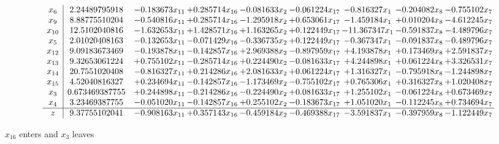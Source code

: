 \documentclass[10pt]{article}
\begin{document}
 \[\begin{array}{c| c c@{\hskip 2pt} c@{\hskip 2pt} c@{\hskip 2pt} c@{\hskip 2pt} c@{\hskip 2pt} c@{\hskip 2pt} c@{\hskip 2pt} }
 x_{6}   &  2.24489795918 & -0.183673 x_{11} & + 0.285714 x_{16} & -0.081633 x_{2} & -0.061224 x_{17} & -0.816327 x_{1} & -0.204082 x_{8} & -0.755102 x_{7}\\
 x_{9}   &  8.88775510204 & -0.540816 x_{11} & + 0.285714 x_{16} & -1.295918 x_{2} & + 0.653061 x_{17} & -1.459184 x_{1} & + 0.010204 x_{8} & -4.612245 x_{7}\\
 x_{10}   &  12.5102040816 & -1.632653 x_{11} & + 1.428571 x_{16} & + 1.163265 x_{2} & + 0.122449 x_{17} & -11.367347 x_{1} & -0.591837 x_{8} & -4.489796 x_{7}\\
 x_{5}   &  2.01020408163 & -0.132653 x_{11} & -0.071429 x_{16} & -0.336735 x_{2} & + 0.122449 x_{17} & -0.367347 x_{1} & -0.091837 x_{8} & -0.489796 x_{7}\\
 x_{12}   &  9.09183673469 & -0.193878 x_{11} & -0.142857 x_{16} & + 2.969388 x_{2} & -0.897959 x_{17} & + 4.193878 x_{1} & + 0.173469 x_{8} & + 2.591837 x_{7}\\
 x_{13}   &  9.32653061224 & + 0.755102 x_{11} & -0.285714 x_{16} & + 0.224490 x_{2} & -0.081633 x_{17} & + 4.244898 x_{1} & + 0.061224 x_{8} & + 3.326531 x_{7}\\
 x_{14}   &  20.7551020408 & -0.816327 x_{11} & + 0.214286 x_{16} & + 2.081633 x_{2} & + 0.061224 x_{17} & + 1.316327 x_{1} & -0.795918 x_{8} & -1.244898 x_{7}\\
 x_{15}   &  4.52040816327 & + 0.234694 x_{11} & -0.142857 x_{16} & -1.173469 x_{2} & -0.755102 x_{17} & + 0.765306 x_{1} & + 0.316327 x_{8} & + 1.020408 x_{7}\\
 x_{3}   &  0.673469387755 & + 0.244898 x_{11} & -0.214286 x_{16} & -0.224490 x_{2} & + 0.081633 x_{17} & + 1.255102 x_{1} & -0.061224 x_{8} & + 0.673469 x_{7}\\
 x_{4}   &  3.23469387755 & -0.051020 x_{11} & -0.142857 x_{16} & + 0.255102 x_{2} & -0.183673 x_{17} & + 1.051020 x_{1} & -0.112245 x_{8} & + 0.734694 x_{7}\\
\hline
z    &  9.37755102041 & -0.908163 x_{11} & + 0.357143 x_{16} & -0.459184 x_{2} & -0.469388 x_{17} & -3.591837 x_{1} & -0.397959 x_{8} & -1.122449 x_{7}\\
\end{array}\]


 $ x_{16} $ enters and $ x_{3} $ leaves 
\end{document}
